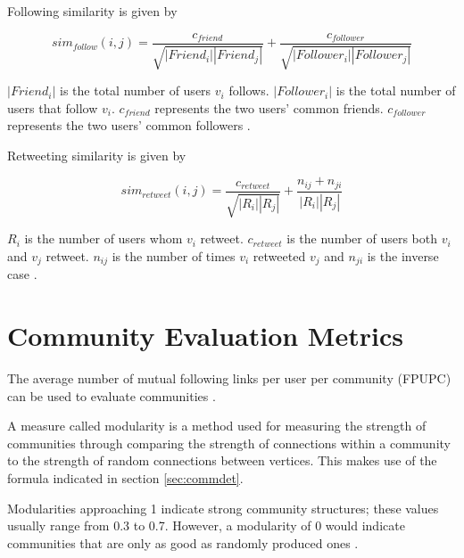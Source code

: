 Following similarity is given by 


\begin{equation}
sim_{follow}(i,j) = \frac{c_{friend}}{\sqrt{\left|{Friend_i}\right|\left|{Friend_j}\right|}} + \frac{c_{follower}}{\sqrt{\left|{Follower_i}\right|\left|{Follower_j}\right|}}
\end{equation}


$\left|{Friend_i}\right|$ is the total number of users $v_i$ follows. $\left|{Follower_i}\right|$ is the total number of users that follow $v_i$. $c_{friend}$ represents the two users’ common friends. $c_{follower}$ represents the two users’ common followers \cite{Zhang:2012}.


Retweeting similarity is given by 


\begin{equation}
sim_{retweet}(i,j) = \frac{c_{retweet}}{\sqrt{\left|{R_i}\right|\left|{R_j}\right|}} + \frac{n_{ij} + n_{ji}}{\left|{R_i}\right|\left|{R_j}\right|}
\end{equation}


$R_i$ is the number of users whom $v_i$ retweet. $c_{retweet}$ is the number of users both $v_i$ and $v_j$ retweet. $n_{ij}$ is the number of times $v_i$ retweeted $v_j$ and $n_{ji}$ is the inverse case \cite{Zhang:2012}. 


\section{Community Evaluation Metrics}


The average number of mutual following links per user per community (FPUPC) can be used to evaluate communities \cite{Zhang:2012}. 


A measure called modularity is a method used for measuring the strength of communities through comparing the strength of connections within a community to the strength of random connections between vertices.\cite{Newman:2004} This makes use of the formula indicated in section \ref{sec:commdet}.


Modularities approaching 1 indicate strong community structures; these values usually range from 0.3 to 0.7. However, a modularity of 0 would indicate communities that are only as good as randomly produced ones \cite{Newman:2004}. 
